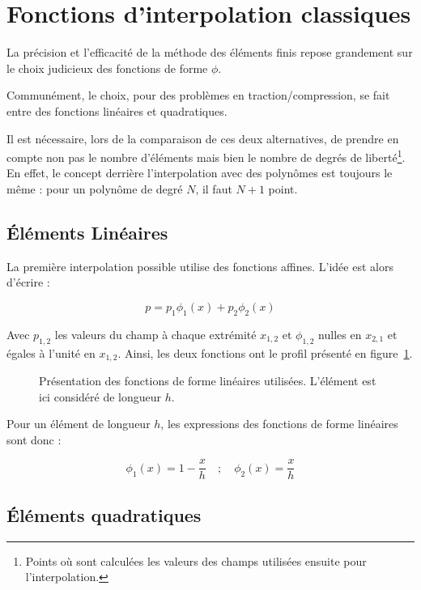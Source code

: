 \section{Fonctions d'interpolation classiques}

La précision et l'efficacité de la méthode des éléments finis repose grandement sur le choix judicieux des fonctions de
forme $\phi$.

Communément, le choix, pour des problèmes en traction/compression, se fait entre des fonctions linéaires et
quadratiques.

Il est nécessaire, lors de la comparaison de ces deux alternatives, de prendre en compte non pas le nombre d'éléments
mais bien le nombre de degrés de liberté\footnote{Points où sont calculées les valeurs des champs utilisées ensuite pour
l'interpolation.}. En effet, le concept derrière l'interpolation avec des polynômes est toujours le même : pour un
polynôme de degré $N$, il faut $N+1$ point.

\subsection{Éléments Linéaires}

La première interpolation possible utilise des fonctions affines. L'idée est alors d'écrire :

$$p = p_1\phi_1(x) + p_2\phi_2(x)$$

Avec $p_{1,2}$ les valeurs du champ à chaque extrémité $x_{1,2}$ et $\phi_{1,2}$ nulles en $x_{2,1}$ et égales à l'unité
en $x_{1,2}$. Ainsi, les deux fonctions ont le profil présenté en figure~\ref{fig:FEM:lin_shape_fun}.

\begin{figure}[!ht]
	\centering
	
	\caption{\label{fig:FEM:lin_shape_fun}Présentation des fonctions de forme linéaires utilisées. L'élément est ici considéré
	de longueur $h$.}
\end{figure}

Pour un élément de longueur $h$, les expressions des fonctions de forme linéaires sont donc :

\begin{equation*}
	\phi_1(x) = 1-\frac{x}{h} \quad;\quad \phi_2(x) = \frac{x}{h}
\end{equation*}


\subsection{Éléments quadratiques}

